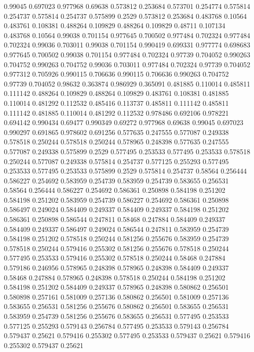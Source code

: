 0.99045 0.697023
0.977968 0.69638
0.573812 0.253684
0.573701 0.254774
0.575814 0.254737
0.575814 0.254737
0.575899 0.2529
0.573812 0.253684
0.483768 0.10564
0.483761 0.108381
0.488264 0.109829
0.488264 0.109829
0.48711 0.107134
0.483768 0.10564
0.99038 0.701154
0.977645 0.700502
0.977484 0.702324
0.977484 0.702324
0.99036 0.703011
0.99038 0.701154
0.990419 0.699331
0.977774 0.698683
0.977645 0.700502
0.99038 0.701154
0.977484 0.702324
0.97739 0.704052
0.990263 0.704752
0.990263 0.704752
0.99036 0.703011
0.977484 0.702324
0.97739 0.704052
0.977312 0.705926
0.990115 0.706636
0.990115 0.706636
0.990263 0.704752
0.97739 0.704052
0.98632 0.363874
0.986929 0.365091
0.481885 0.110014
0.485811 0.111142
0.488264 0.109829
0.488264 0.109829
0.483761 0.108381
0.481885 0.110014
0.481292 0.112532
0.485416 0.113737
0.485811 0.111142
0.485811 0.111142
0.481885 0.110014
0.481292 0.112532
0.978486 0.692106
0.978221 0.694142
0.990434 0.69477
0.990349 0.69272
0.977968 0.69638
0.99045 0.697023
0.990297 0.691865
0.978602 0.691256
0.577635 0.247555
0.577087 0.249338
0.578518 0.250244
0.578518 0.250244
0.578965 0.248398
0.577635 0.247555
0.577087 0.249338
0.575899 0.2529
0.577495 0.253533
0.577495 0.253533
0.578518 0.250244
0.577087 0.249338
0.575814 0.254737
0.577125 0.255293
0.577495 0.253533
0.577495 0.253533
0.575899 0.2529
0.575814 0.254737
0.58564 0.256444
0.586227 0.254692
0.583959 0.254739
0.583959 0.254739
0.583655 0.256531
0.58564 0.256444
0.586227 0.254692
0.586361 0.250898
0.584198 0.251202
0.584198 0.251202
0.583959 0.254739
0.586227 0.254692
0.586361 0.250898
0.586497 0.249024
0.584409 0.249337
0.584409 0.249337
0.584198 0.251202
0.586361 0.250898
0.586544 0.247811
0.58468 0.247884
0.584409 0.249337
0.584409 0.249337
0.586497 0.249024
0.586544 0.247811
0.583959 0.254739
0.584198 0.251202
0.578518 0.250244
0.581256 0.255676
0.583959 0.254739
0.578518 0.250244
0.579416 0.255302
0.581256 0.255676
0.578518 0.250244
0.577495 0.253533
0.579416 0.255302
0.578518 0.250244
0.58468 0.247884
0.579186 0.246956
0.578965 0.248398
0.578965 0.248398
0.584409 0.249337
0.58468 0.247884
0.578965 0.248398
0.578518 0.250244
0.584198 0.251202
0.584198 0.251202
0.584409 0.249337
0.578965 0.248398
0.580862 0.256501
0.580898 0.257161
0.581009 0.257136
0.580862 0.256501
0.581009 0.257136
0.583655 0.256531
0.581256 0.255676
0.580862 0.256501
0.583655 0.256531
0.583959 0.254739
0.581256 0.255676
0.583655 0.256531
0.577495 0.253533
0.577125 0.255293
0.579143 0.256784
0.577495 0.253533
0.579143 0.256784
0.579437 0.25621
0.579416 0.255302
0.577495 0.253533
0.579437 0.25621
0.579416 0.255302
0.579437 0.25621
